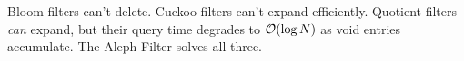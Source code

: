 \begin{insightbox}
Bloom filters can't delete. Cuckoo filters can't expand efficiently.
Quotient filters \emph{can} expand, but their query time degrades to
$\mathcal{O}(\log N)$ as void entries accumulate. The Aleph Filter solves all three.
\end{insightbox}



